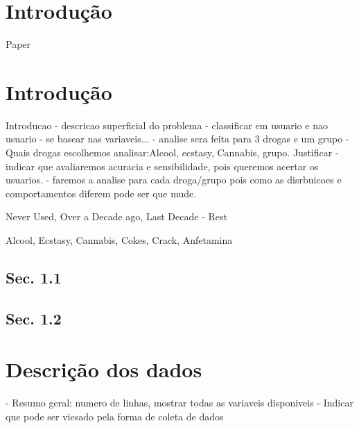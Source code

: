 \documentclass[
	article,			%
	11pt,				%
	oneside,			%
	a4paper,			%
	english,			%
	brazil,				%
	sumario=tradicional
	]{abntex2}
\begin{document}
\textual
\section*{Introdução}


Paper \cite{fehrman2015}

\section{Introdução}

Introducao - descricao superficial do problema
- classificar em usuario e nao usuario 
- se basear nas variaveis... 
- analise sera feita para 3 drogas e um grupo
- Quais drogas escolhemos analisar:Alcool, ecstasy, Cannabis, grupo. Justificar
- indicar que avaliaremos acuracia e sensibilidade, pois queremos acertar os usuarios.
- faremos a analise para cada droga/grupo pois como as disrbuicoes e comportamentos diferem pode ser que mude.

{Never Used, Over a Decade ago, Last Decade} - Rest


Alcool, Ecstasy, Cannabis, {Cokes, Crack, Anfetamina}

\lipsum[2]

\subsection{Sec. 1.1}

\lipsum[3]

\subsection{Sec. 1.2}

\lipsum[4]

\section{Descrição dos dados}


- Resumo geral: numero de linhas, mostrar todas as variaveis disponiveis
- Indicar que pode ser viesado pela forma de coleta de dados
\end{document}
